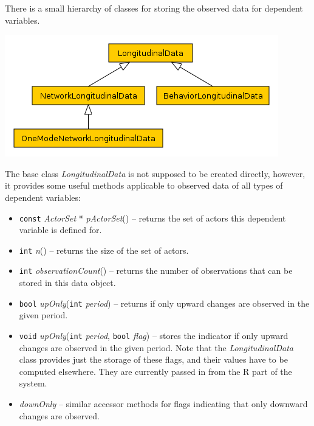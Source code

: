 \documentclass[12pt]{article}
\renewcommand{\=}{\,=\,}
\newcommand{\+}{\,+\,}
\newcommand{\nnm}[1]{\textsf{\small\textit{#1}}}
\begin{document}
There is a small hierarchy of classes for storing the observed data for
dependent variables.
\begin{center}
\includegraphics[scale=.5]{LongitudinalData.png}
\end{center}
The base class \nnm{LongitudinalData} is not supposed to
be created directly, however, it provides some useful methods applicable to
observed data of all types of dependent variables:
\begin{itemize}
\item \verb|const| \nnm{ActorSet} * \nnm{pActorSet}() -- returns the set of
actors this dependent variable is defined for.
\item \verb|int| \nnm{n}() -- returns the size of the set of actors.
\item \verb|int| \nnm{observationCount}() -- returns the number of observations
that can be stored in this data object.
\item \verb|bool| \nnm{upOnly}(\verb|int| \nnm{period}) -- returns if only
upward changes are observed in the given period.
\item \verb|void| \nnm{upOnly}(\verb|int| \nnm{period}, \verb|bool| \nnm{flag})
-- stores the indicator if only upward changes are observed in the given period.
Note that the \nnm{LongitudinalData} class provides just the storage of these
flags, and their values have to be computed elsewhere. They are currently
passed in from the R part of the system.
\item \nnm{downOnly} -- similar accessor methods for flags indicating that only
downward changes are observed.
\end{itemize}
\end{document}
